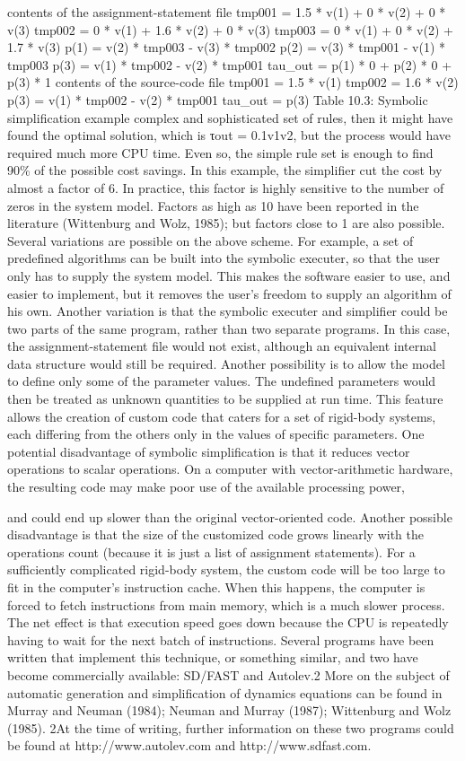 contents of the assignment-statement file tmp001 = 1.5 * v(1) + 0 * v(2) + 0 * v(3) tmp002 = 0 * v(1) + 1.6 * v(2) + 0 * v(3) tmp003 = 0 * v(1) + 0 * v(2) + 1.7 * v(3) p(1) = v(2) * tmp003 - v(3) * tmp002 p(2) = v(3) * tmp001 - v(1) * tmp003 p(3) = v(1) * tmp002 - v(2) * tmp001 tau\_out = p(1) * 0 + p(2) * 0 + p(3) * 1 contents of the source-code file tmp001 = 1.5 * v(1) tmp002 = 1.6 * v(2) p(3) = v(1) * tmp002 - v(2) * tmp001 tau\_out = p(3) Table 10.3: Symbolic simplification example complex and sophisticated set of rules, then it might have found the optimal solution, which is τout = 0.1v1v2, but the process would have required much more CPU time. Even so, the simple rule set is enough to find 90\% of the possible cost savings. In this example, the simplifier cut the cost by almost a factor of 6. In practice, this factor is highly sensitive to the number of zeros in the system model. Factors as high as 10 have been reported in the literature (Wittenburg and Wolz, 1985); but factors close to 1 are also possible. Several variations are possible on the above scheme. For example, a set of predefined algorithms can be built into the symbolic executer, so that the user only has to supply the system model. This makes the software easier to use, and easier to implement, but it removes the user’s freedom to supply an algorithm of his own. Another variation is that the symbolic executer and simplifier could be two parts of the same program, rather than two separate programs. In this case, the assignment-statement file would not exist, although an equivalent internal data structure would still be required. Another possibility is to allow the model to define only some of the parameter values. The undefined parameters would then be treated as unknown quantities to be supplied at run time. This feature allows the creation of custom code that caters for a set of rigid-body systems, each differing from the others only in the values of specific parameters. One potential disadvantage of symbolic simplification is that it reduces vector operations to scalar operations. On a computer with vector-arithmetic hardware, the resulting code may make poor use of the available processing power,

and could end up slower than the original vector-oriented code. Another possible disadvantage is that the size of the customized code grows linearly with the operations count (because it is just a list of assignment statements). For a sufficiently complicated rigid-body system, the custom code will be too large to fit in the computer’s instruction cache. When this happens, the computer is forced to fetch instructions from main memory, which is a much slower process. The net effect is that execution speed goes down because the CPU is repeatedly having to wait for the next batch of instructions. Several programs have been written that implement this technique, or something similar, and two have become commercially available: SD/FAST and Autolev.2 More on the subject of automatic generation and simplification of dynamics equations can be found in Murray and Neuman (1984); Neuman and Murray (1987); Wittenburg and Wolz (1985). 2At the time of writing, further information on these two programs could be found at http://www.autolev.com and http://www.sdfast.com.
